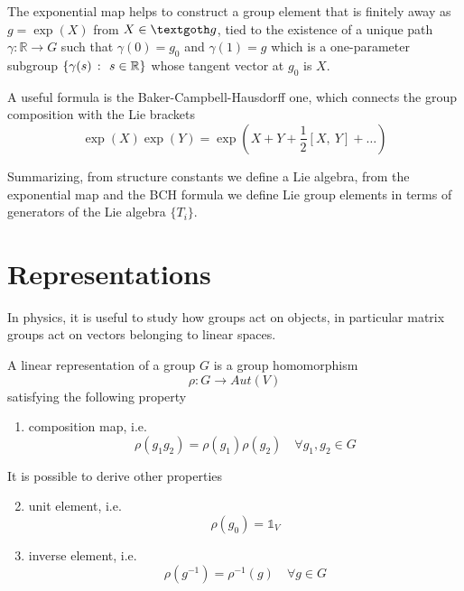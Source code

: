     The exponential map helps to construct a group element that is finitely away as $g = \exp(X)$ from $X \in \textgoth g$, tied to the existence of a unique path $\gamma \colon \mathbb R \rightarrow G$ such that $\gamma(0) = g_0$ and $\gamma(1) = g$ which is a one-parameter subgroup $\{\gamma(s)~\colon~s \in \mathbb R\}$ whose tangent vector at $g_0$ is $X$.  

    A useful formula is the Baker-Campbell-Hausdorff one, which connects the group composition with the Lie brackets
    \begin{equation}\label{BCH}
        \exp(X)\exp(Y) = \exp(X + Y + \frac{1}{2} [X, ~Y] + \ldots)
    \end{equation}

    Summarizing, from structure constants we define a Lie algebra, from the exponential map and the BCH formula we define Lie group elements in terms of generators of the Lie algebra $\{T_i\}$.

\chapter{Representations}

    In physics, it is useful to study how groups act on objects, in particular matrix groups act on vectors belonging to linear spaces.

    \begin{definition}[Representation]
        A linear representation of a group $G$ is a group homomorphism 
        \begin{equation*}
            \rho \colon G \rightarrow Aut(V) 
        \end{equation*}
        satisfying the following property
        \begin{enumerate}
            \item composition map, i.e.
            \begin{equation*}
                \rho(g_1 g_2) = \rho(g_1) \rho(g_2) \quad \forall g_1, g_2 \in G
            \end{equation*}
        \end{enumerate}
    \end{definition}

    It is possible to derive other properties
    \begin{enumerate}
    \setcounter{enumi}{1}
        \item unit element, i.e.
        \begin{equation*}
            \rho(g_0) = \mathds 1_V
        \end{equation*}
        \item inverse element, i.e.
        \begin{equation*}
            \rho(g^{-1}) = \rho^{-1}(g) \quad \forall g \in G
        \end{equation*}
    \end{enumerate}

